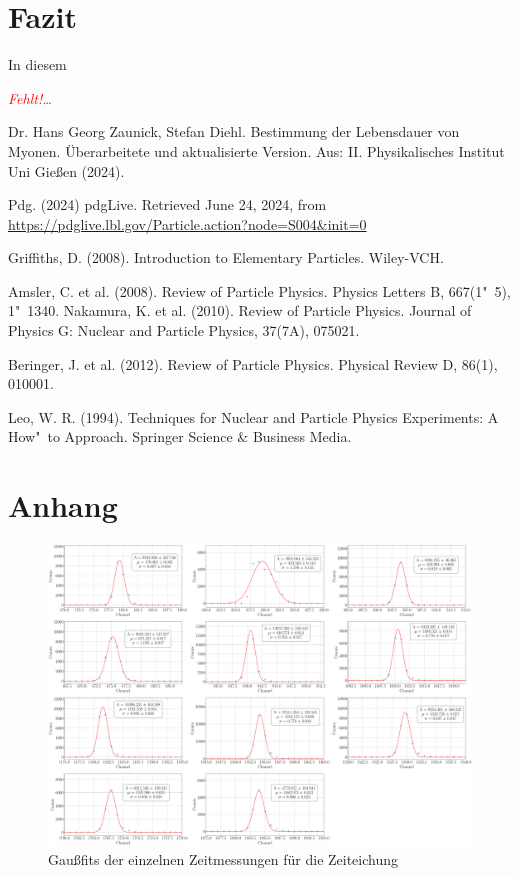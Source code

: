 \documentclass[12pt,a4paper,ngerman]{report}
\providecommand{\fehlt}{\textcolor{red}{\emph{Fehlt!\dots}}}
\begin{document}
\chapter{Fazit}
	In diesem
	
	\fehlt
	

	\listoffigures
	
	\begin{thebibliography}{111} %
		Dr. Hans Georg Zaunick, Stefan Diehl. \glqq Bestimmung der Lebensdauer von Myonen\grqq. Überarbeitete und aktualisierte Version. Aus: II. Physikalisches Institut
		Uni Gießen (2024).
		
		Pdg. (2024) pdgLive. Retrieved June 24, 2024, from \url{https://pdglive.lbl.gov/Particle.action?node=S004&init=0}

		Griffiths, D. (2008). Introduction to Elementary Particles. Wiley-VCH.

		Amsler, C. et al. (2008). Review of Particle Physics. Physics Letters B, 667(1"~5), 1"~1340.
		Nakamura, K. et al. (2010). Review of Particle Physics. Journal of Physics G: Nuclear and Particle Physics, 37(7A), 075021.

		Beringer, J. et al. (2012). Review of Particle Physics. Physical Review D, 86(1), 010001.

		Leo, W. R. (1994). Techniques for Nuclear and Particle Physics Experiments: A How"~to Approach. Springer Science \& Business Media.
		
		
		
	\end{thebibliography}


\chapter*{Anhang} \label{ch:Anhang}
\FloatBarrier
	\begin{figure}[ht]
	\centering
	\includegraphics[width=\textwidth]{Bilder/timeGaussFits.pdf}		
	\caption[Übersicht der Gaußfits]{Gaußfits der einzelnen Zeitmessungen für die Zeiteichung}
	\label{img:TimeGauss}
\end{figure}
\end{document}
